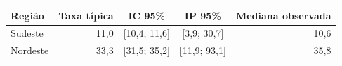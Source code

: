 \begin{tabular}{@{}lrccr@{}}
\toprule
\textbf{Região} & \textbf{Taxa típica} & \textbf{IC 95\%} & \textbf{IP 95\%} & \textbf{Mediana observada}\\
\midrule
Sudeste & 11,0 & [10,4; 11,6] & [3,9; 30,7] & 10,6\\
Nordeste & 33,3 & [31,5; 35,2] & [11,9; 93,1] & 35,8\\
\bottomrule
\end{tabular}
